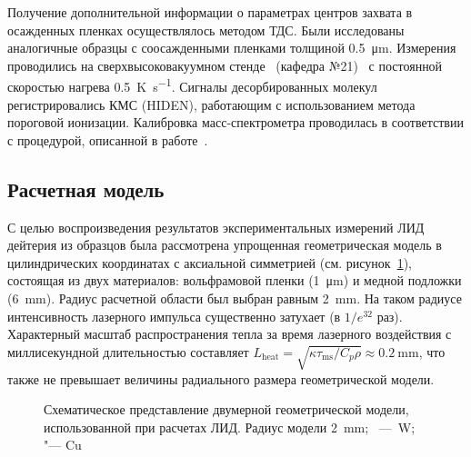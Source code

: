 Получение дополнительной информации о параметрах центров захвата в осажденных пленках осуществлялось методом ТДС. Были исследованы аналогичные образцы с соосажденными пленками толщиной \SI{0.5}{\micro\metre}. Измерения проводились на сверхвысоковакуумном стенде \thesisOrganizationShort \ (кафедра №21)~\cite{Rusinov2009} с постоянной скоростью нагрева \SI{0.5}{\kelvin\per\second}. Сигналы десорбированных молекул регистрировались КМС (HIDEN), работающим с использованием метода пороговой ионизации. Калибровка масс-спектрометра проводилась в соответствии с процедурой, описанной в работе~\cite{Rusinov2009}.

\subsection{Расчетная модель}\label{subsec:ch4/sec1/subsec3}

С целью воспроизведения результатов экспериментальных измерений ЛИД дейтерия из образцов была рассмотрена упрощенная геометрическая модель в цилиндрических координатах с аксиальной симметрией (см. рисунок~\cref{fig:ch4/LID_geom}), состоящая из двух материалов: вольфрамовой пленки (\SI{1}{\micro\meter}) и медной подложки (\SI{6}{\milli\meter}). Радиус расчетной области был выбран равным \SI{2}{\milli\meter}. На таком радиусе интенсивность лазерного импульса существенно затухает (в \( 1/e^{32} \) раз). Характерный масштаб распространения тепла за время лазерного воздействия с миллисекундной длительностью составляет \( L_\mathrm{heat}=\sqrt{\kappa \tau_\mathrm{ms}/C_p \rho} \approx \SI{0.2}{\milli\meter} \), что также не превышает величины радиального размера геометрической модели.

\begin{figure}[ht]
    \caption{Схематическое представление двумерной геометрической модели, использованной при расчетах ЛИД. Радиус модели \SI{2}{\milli\meter}; \cruleme[customgrey]{0.5cm}{0.5cm}~---~W; \cruleme[customorange]{0.5cm}{0.5cm} "--- Cu}\label{fig:ch4/LID_geom}
\end{figure}

